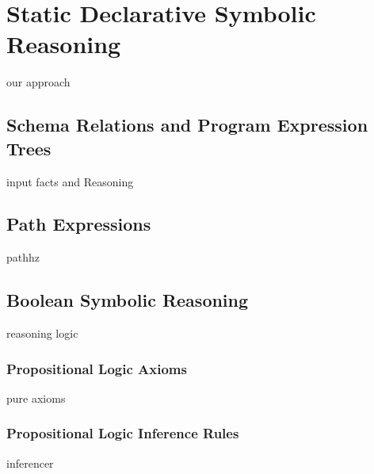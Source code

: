 
\chapter{Static Declarative Symbolic Reasoning}\label{c:main-content}

our approach

\section{Schema Relations and Program Expression Trees}

input facts and Reasoning

\section{Path Expressions}

pathhz

\section{Boolean Symbolic Reasoning}

reasoning logic

\subsection{Propositional Logic Axioms}

pure axioms

\subsection{Propositional Logic Inference Rules}

inferencer
